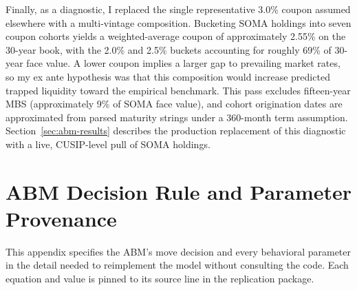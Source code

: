 \documentclass[12pt]{article}
\begin{document}
Finally, as a diagnostic, I replaced the single representative 3.0\% coupon assumed elsewhere with a multi-vintage composition. Bucketing SOMA holdings into seven coupon cohorts yields a weighted-average coupon of approximately 2.55\% on the 30-year book, with the 2.0\% and 2.5\% buckets accounting for roughly 69\% of 30-year face value. A lower coupon implies a larger gap to prevailing market rates, so my ex ante hypothesis was that this composition would increase predicted trapped liquidity toward the empirical benchmark. This pass excludes fifteen-year MBS (approximately 9\% of SOMA face value), and cohort origination dates are approximated from parsed maturity strings under a 360-month term assumption. Section~\ref{sec:abm-results} describes the production replacement of this diagnostic with a live, CUSIP-level pull of SOMA holdings.

\section{ABM Decision Rule and Parameter Provenance}\label{app:abmspec}

This appendix specifies the ABM's move decision and every behavioral parameter in the detail needed to reimplement the model without consulting the code. Each equation and value is pinned to its source line in the replication package.
\end{document}
